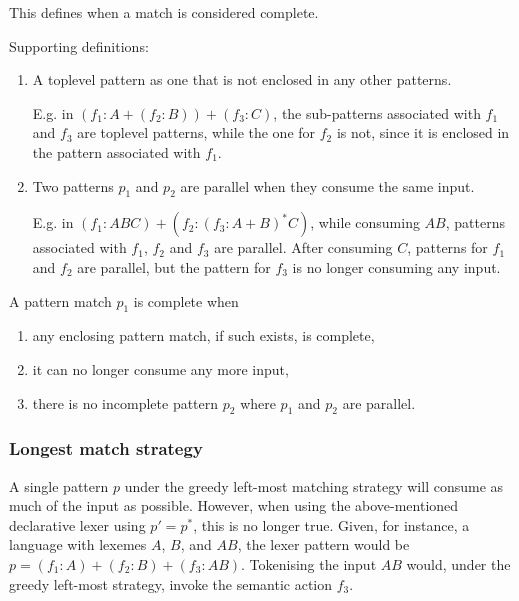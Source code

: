 \needspace{5cm}
\begin{defn}
   This defines when a match is considered complete.

   Supporting definitions:
   \begin{enumerate}

      \item A toplevel pattern as one that is not enclosed in any other patterns.
         
         E.g. in $(f_1:A+(f_2:B))+(f_3:C)$, the sub-patterns associated with
         $f_1$ and $f_3$ are toplevel patterns, while the one for $f_2$ is not,
         since it is enclosed in the pattern associated with $f_1$.

      \item Two patterns $p_1$ and $p_2$ are parallel when they consume the same
         input.

         E.g. in $(f_1:ABC)+(f_2:(f_3:A+B)^*C)$, while consuming $AB$, patterns
         associated with $f_1$, $f_2$ and $f_3$ are parallel. After consuming
         $C$, patterns for $f_1$ and $f_2$ are parallel, but the pattern for
         $f_3$ is no longer consuming any input.

   \end{enumerate}

   A pattern match $p_1$ is complete when
   \begin{enumerate}

      \item any enclosing pattern match, if such exists, is complete,

      \item it can no longer consume any more input,

      \item there is no incomplete pattern $p_2$ where $p_1$ and $p_2$ are
         parallel.

   \end{enumerate}

\end{defn}

\subsubsection{Longest match strategy}

A single pattern $p$ under the greedy left-most matching strategy will consume
as much of the input as possible. However, when using the above-mentioned
declarative lexer using $p' = p^*$, this is no longer true. Given, for instance,
a language with lexemes $A$, $B$, and $AB$, the lexer pattern would be $p =
(f_1:A) + (f_2:B) + (f_3:AB)$. Tokenising the input $AB$ would, under the greedy
left-most strategy, invoke the semantic action $f_3$.


